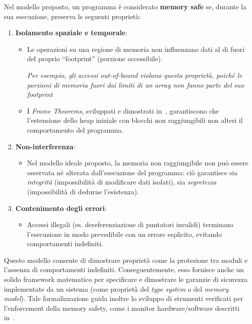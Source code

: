 Nel modello proposto, un programma è considerato \textbf{memory safe} se, durante
la sua esecuzione, preserva le seguenti proprietà:
\begin{enumerate}
  \item \textbf{Isolamento spaziale e temporale}:
    \begin{itemize}
      \item Le operazioni su una regione di memoria non influenzano dati al di fuori
        del proprio ``footprint'' (porzione accessibile).

        \textit{Per esempio, gli accessi out-of-bound violano questa proprietà,
        poiché le porzioni di memoria fuori dai limiti di un array non fanno
        parte del suo footprint}

      \item I \textit{Frame Theorems}, sviluppati e dimostrati in~\cite{meaning_memory_safety},
        garantiscono che l'estensione dello heap iniziale con blocchi non
        raggiungibili non alteri il comportamento del programma.
    \end{itemize}

  \item \textbf{Non-interferenza}:
    \begin{itemize}
      \item Nel modello ideale proposto, la memoria non raggiungibile non può
        essere osservata né alterata dall'esecuzione del programma: ciò garantisce
        sia \textit{integrità} (impossibilità di modificare dati isolati), sia \textit{segretezza}
        (impossibilità di dedurne l'esistenza).
    \end{itemize}

  \item \textbf{Contenimento degli errori}:
    \begin{itemize}
      \item Accessi illegali (es. dereferenziazione di puntatori invalidi)
        terminano l'esecuzione in modo prevedibile con un errore esplicito, evitando
        comportamenti indefiniti.
    \end{itemize}
\end{enumerate}

Questo modello consente di dimostrare proprietà come la protezione tra moduli e
l'assenza di comportamenti indefiniti. Conseguentemente, esso fornisce anche un
solido framework matematico per specificare e dimostrare le garanzie di
sicurezza implementate da un sistema (come proprietà del \textit{type system} o
del \textit{memory model}). Tale formalizzazione guida inoltre lo sviluppo di strumenti
verificati per l'enforcement della memory safety, come i monitor hardware/software
descritti in~\cite{meaning_memory_safety}.

